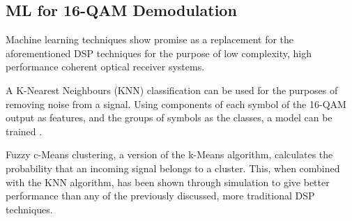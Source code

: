 \subsection{ML for 16-QAM Demodulation}

Machine learning techniques show promise as a replacement for the aforementioned
DSP techniques for the purpose of low complexity, high performance coherent
optical receiver systems.

\par A K-Nearest Neighbours (KNN) classification can be used for the purposes of
removing noise from a signal. Using components of each symbol of the 16-QAM
output as features, and the groups of symbols as the classes, a model can be
trained .

\par Fuzzy c-Means clustering, a version of the k-Means algorithm, calculates
the probability that an incoming signal belongs to a cluster. This, when
combined with the KNN algorithm, has been shown through simulation to give
better performance than any of the previously discussed, more traditional DSP
techniques\cite{kMeans_2019}.
